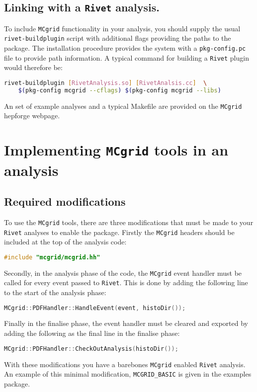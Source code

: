 \documentclass[11pt]{article}
\newcommand{\mcgrid} {{\tt MCgrid}\xspace}
\newcommand{\rivet} {{\tt Rivet}\xspace}
\begin{document}
\subsection{Linking with a \rivet analysis.}
To include \mcgrid functionality in your analysis, you should supply the usual \\ \lstinline[language=bash]{rivet-buildplugin} script with additional flags providing the paths to the package. The installation procedure provides the system with a \lstinline[language=bash]{pkg-config.pc} file to provide path information. A typical command for building a \rivet plugin would therefore be:
\begin{lstlisting}[language=bash]
 rivet-buildplugin [RivetAnalysis.so] [RivetAnalsis.cc]  \
    $(pkg-config mcgrid --cflags) $(pkg-config mcgrid --libs)
\end{lstlisting}
An set of example analyses and a typical Makefile are provided on the \mcgrid hepforge webpage.

\section{Implementing \mcgrid tools in an analysis}
\subsection{Required modifications}
To use the \mcgrid tools, there are three modifications that must be made to your \rivet analyses to enable the package.
Firstly the \mcgrid headers should be included at the top of the analysis code:
\begin{lstlisting}[language=c++]
	#include "mcgrid/mcgrid.hh"
\end{lstlisting}
Secondly, in the analysis phase of the code, the \mcgrid event handler must be called for every event passed to \rivet. This is done by adding the following line to the start of the analysis phase:
\begin{lstlisting}[language=c++]
	MCgrid::PDFHandler::HandleEvent(event, histoDir());
\end{lstlisting}
Finally in the finalise phase, the event handler must be cleared and exported by adding the following as the final line in the finalise phase:
\begin{lstlisting}[language=c++]
	MCgrid::PDFHandler::CheckOutAnalysis(histoDir());
\end{lstlisting}
With these modifications you have a barebones \mcgrid enabled \rivet analysis. An example of this minimal modification, \lstinline[language=bash]{MCGRID_BASIC} is given in the examples package.
\end{document}
